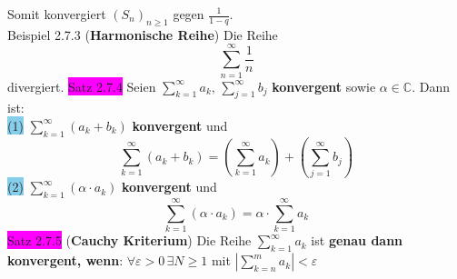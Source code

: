 \documentclass[landscape, 10pt]{article}
\newcommand{\C}{\mathbb{C}}
\begin{document}
\begin{multicols}{3}
\begin{equation*}
                     \end{equation*}
                     Somit konvergiert $(S_n)_{n\geqslant1}$ gegen
                     $\frac{1}{1-q}$.\\
              \colorbox{Dandelion}{Beispiel 2.7.3} 
              (\textbf{Harmonische Reihe}) 
                     Die Reihe
                     \begin{equation*}
                            \sum_{n=1}^\infty\frac{1}{n}
                     \end{equation*}
                     divergiert.
              \newpage
              \colorbox{magenta}{Satz 2.7.4} Seien 
                     \textcolor{NavyBlue}{
                     $\sum_{k=1}^\infty a_k,\,\sum_{j=1}^\infty b_j$} 
                     \textbf{konvergent} sowie 
                     \textcolor{NavyBlue}{$\alpha\in\C$}. 
                     Dann ist:\\
                     \colorbox{SkyBlue}{(1)} 
                            \textcolor{NavyBlue}{
                            $\sum_{k=1}^\infty(a_k+b_k)$} 
                            \textbf{konvergent} und 
                            \begin{equation*}
                                   \sum_{k=1}^\infty(a_k+b_k)
                                   =(\sum_{k=1}^\infty a_k)
                                   +(\sum_{j=1}^\infty b_j)
                            \end{equation*}
                     \colorbox{SkyBlue}{(2)} 
                            \textcolor{NavyBlue}{
                            $\sum_{k=1}^\infty(\alpha\cdot a_k)$} 
                            \textbf{konvergent} und 
                            \begin{equation*}
                                   \sum_{k=1}^\infty
                                   (\alpha\cdot a_k)
                                   =\alpha\cdot
                                   \sum_{k=1}^\infty a_k
                            \end{equation*}
              \colorbox{magenta}{Satz 2.7.5} 
              (\textbf{Cauchy Kriterium}) 
                     Die Reihe 
                     \textcolor{NavyBlue}{
                     $\sum_{k=1}^\infty a_k$ }
                     ist \textbf{genau dann konvergent, wenn}:
                     \textcolor{NavyBlue}{
                     $\forall\varepsilon >0\,
                     \exists N\geqslant1$} mit 
                     \textcolor{NavyBlue}{
                     $|\sum_{k=n}^m a_k|<\varepsilon$\quad
}
\end{multicols}
\end{document}
